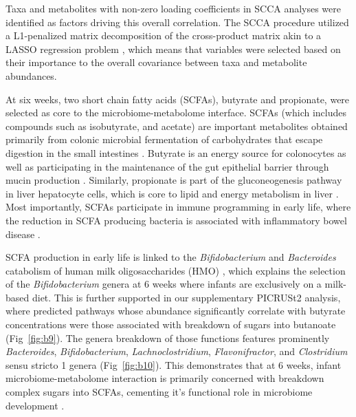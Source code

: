 Taxa and metabolites with non-zero loading coefficients in SCCA analyses were identified as factors driving this overall correlation. The SCCA procedure utilized a L1-penalized matrix decomposition of the cross-product matrix akin to a LASSO regression problem \cite{witten2019pma}, which means that variables were selected based on their importance to the overall covariance between taxa and metabolite abundances. 

At six weeks, two short chain fatty acids (SCFAs), butyrate and propionate, were selected as core to the microbiome-metabolome interface. SCFAs (which includes compounds such as isobutyrate, and acetate) are important metabolites obtained primarily from colonic microbial fermentation of carbohydrates that escape digestion in the small intestines \cite{morrison2016formation}. Butyrate is an energy source for colonocytes \cite{leblanc2017beneficial} as well as participating in the maintenance of the gut epithelial barrier through mucin production \cite{peng2009butyrate}. Similarly, propionate is part of the gluconeogenesis pathway in liver hepatocyte cells, which is core to lipid and energy metabolism in liver \cite{denbesten2013gutderived}. Most importantly, SCFAs participate in immune programming in early life, where the reduction in SCFA producing bacteria is associated with inflammatory bowel disease \cite{correa-oliveira2016regulation, schulthess2019short}. 

SCFA production in early life is linked to the \emph{Bifidobacterium} and \emph{Bacteroides} catabolism of human milk oligosaccharides (HMO) \cite{james2019metabolism, lawson2020breast, marcobal2011bacteroides}, which explains the selection of the \emph{Bifidobacterium} genera at 6 weeks where infants are exclusively on a milk-based diet. This is further supported in our supplementary PICRUSt2 analysis, where predicted pathways whose abundance significantly correlate with butyrate concentrations were those associated with breakdown of sugars into butanoate (Fig~\ref{fig:b9}). The genera breakdown of those functions features prominently \emph{Bacteroides}, \emph{Bifidobacterium}, \emph{Lachnoclostridium}, \emph{Flavonifractor}, and \emph{Clostridium} sensu stricto 1 genera (Fig~\ref{fig:b10}). This demonstrates that at 6 weeks, infant microbiome-metabolome interaction is primarily concerned with breakdown complex sugars into SCFAs, cementing it’s functional role in microbiome development \cite{stewart2018temporal}. 

